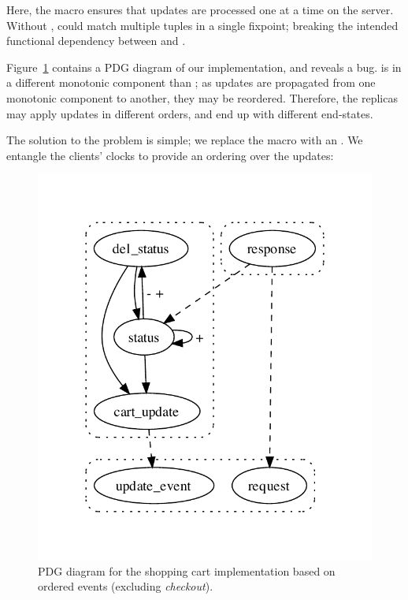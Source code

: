 Here, the  macro ensures that updates are
processed one at a time on the server.  Without ,
 could match multiple tuples in a single fixpoint;
breaking the intended functional dependency between 
and .


Figure~\ref{fig:cs-pdg-2} contains a PDG diagram of our
implementation, and reveals a bug.   is in a
different monotonic component than ; as updates
are propagated from one monotonic component to another, they may be
reordered.  Therefore, the replicas may apply updates in different
orders, and end up with different end-states.

The solution to the problem is simple; we replace the  macro with an .  We entangle the clients' clocks to provide an ordering over the updates:


\begin{figure}[t]
\centering
\includegraphics[width=0.65\linewidth]{vizza_straw.pdf}
\caption{PDG diagram for the shopping cart implementation based on ordered events (excluding {\em checkout}).}
\label{fig:cs-pdg-2}
\end{figure}

